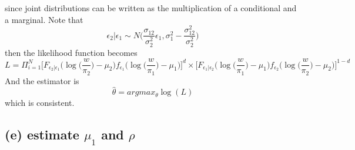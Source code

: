 \documentclass[12pt]{article}
\begin{document}
since joint distributions can be written as the multiplication of a conditional and a marginal. Note that 
\[ \epsilon_2|\epsilon_1 \sim N \big(\frac{\sigma_{12}}{\sigma_2^2} \epsilon_1,
    \sigma_1^2 - \frac{\sigma_{12}^2}{\sigma_2^2}\big) \]
then the likelihood function becomes 
\[L =  \Pi_{i = 1}^N \bigg[ F_{\epsilon_2 |\epsilon_1} \bigg(\log \big(\frac{w}{\pi_2}\big) - \mu_2\bigg)f_{\epsilon_1} \bigg(\log \big(\frac{w}{\pi_1}\big) - \mu_1 \bigg)\bigg]^d 
\times  
\bigg[ F_{\epsilon_1 |\epsilon_2} \bigg(\log \big(\frac{w}{\pi_1}\big) - \mu_1\bigg) f_{\epsilon_2} \bigg(\log \big(\frac{w}{\pi_2}\big) - \mu_2 \bigg)\bigg]^{1-d}
    \]
And the estimator is 
\[ \hat\theta = argmax_{\theta} \log(L)\]
which is consistent. 


\subsection*{(e) estimate $\mu_1$ and $\rho$ }    

\end{document}
